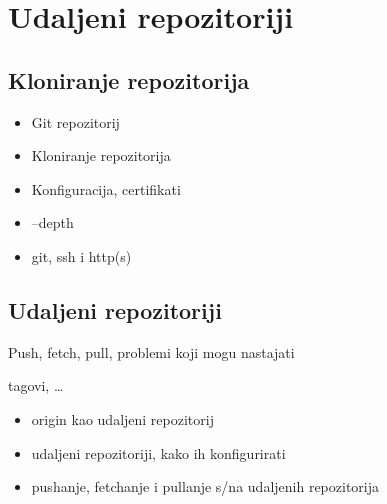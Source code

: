 \chapter*{Udaljeni repozitoriji}

\section*{Kloniranje repozitorija}

\begin{itemize}
   \item Git repozitorij
   \item Kloniranje repozitorija
   \item Konfiguracija, certifikati
   \item --depth
   \item git, ssh i http(s)
\end{itemize}

\section*{Udaljeni repozitoriji}

Push, fetch, pull, problemi koji mogu nastajati

tagovi, \dots

\begin{itemize}
   \item origin kao udaljeni repozitorij
   \item udaljeni repozitoriji, kako ih konfigurirati
   \item pushanje, fetchanje i pullanje s/na udaljenih repozitorija
\end{itemize}


